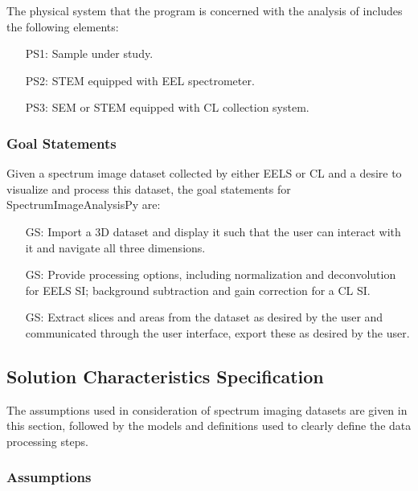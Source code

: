 \documentclass[12pt]{article}
\newcounter{goalnum} %
\newcommand{\progname}{SpectrumImageAnalysisPy} %
\begin{document}
The physical system that the program is concerned with the analysis of includes
the following elements:

\begin{itemize}
	\item[PS1:] Sample under study.
	\item[PS2:] STEM equipped with EEL spectrometer.
	\item[PS3:] SEM or STEM equipped with CL collection system.
\end{itemize}

\subsubsection{Goal Statements}

\noindent Given a spectrum image dataset collected by either EELS or CL and a
desire to visualize and process this dataset, the goal statements for
\progname{} are:

\begin{itemize}
	\item[GS\refstepcounter{goalnum}\thegoalnum \label{G_ImportDisplay}:] Import a
3D dataset and display it such that the user can interact with it and navigate
all three dimensions.
	\item[GS\refstepcounter{goalnum}\thegoalnum \label{G_Processing}:] Provide
processing options, including normalization and deconvolution for EELS SI;
background subtraction and gain correction for a CL SI.
	\item[GS\refstepcounter{goalnum}\thegoalnum \label{G_Extraction}:] Extract
slices and areas from the dataset as desired by the user and communicated
through the user interface, export these as desired by the user.
\end{itemize}


\subsection{Solution Characteristics Specification}

The assumptions used in consideration of spectrum imaging datasets are given in
this section, followed by the models and definitions used to clearly define the
data processing steps.

\subsubsection{Assumptions}
\end{document}
